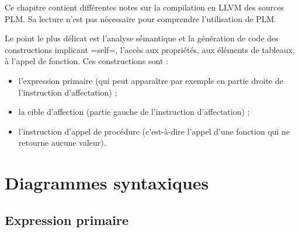 





Ce chapitre contient différentes notes sur la compilation en LLVM des sources PLM. Sa lecture n'est pas nécessaire pour comprendre l'utilisation de PLM. 


Le point le plus délicat est l'analyse sémantique et la génération de code des constructions implicant \plm=self=, l'accès aux propriétés, aux éléments de tableaux, à l'appel de fonction. Ces constructions sont :
\begin{itemize}
  \item l'expression primaire (qui peut apparaître par exemple en partie droite de l'instruction d'affectation) ;
  \item la cible d'affection (partie gauche de l'instruction d'affectation) ;
  \item l'instruction d'appel de procédure (c'est-à-dire l'appel d'une fonction qui ne retourne aucune valeur).
\end{itemize}

\section{Diagrammes syntaxiques}


\subsection{Expression primaire}

